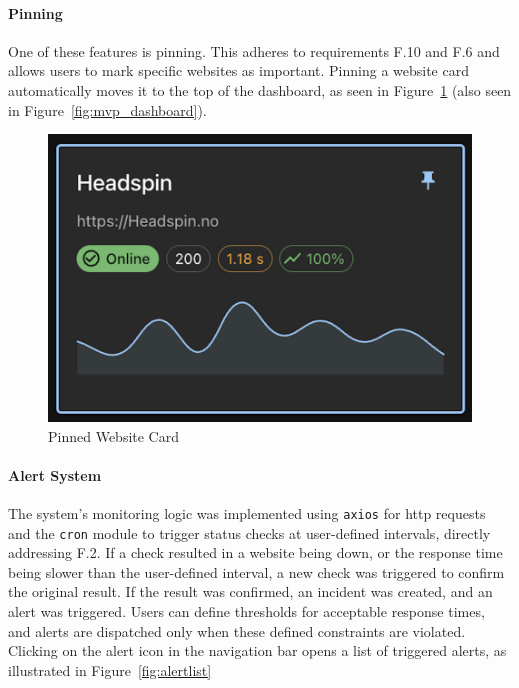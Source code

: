 \paragraph{Pinning}
One of these features is pinning. This adheres to requirements F.10 and F.6 and allows users to mark specific websites as important. Pinning a website card automatically moves it to the top of the dashboard, as seen in Figure~\ref{fig:mvp_pinned_card} (also seen in Figure~\ref{fig:mvp_dashboard}).

\begin{figure}[H]
    \centering
    \includegraphics[width=0.5\linewidth]{figures/MVP-dashboard/MVP-pinned-card.png}
    \caption{Pinned Website Card}
    \label{fig:mvp_pinned_card}
\end{figure}

\paragraph{Alert System}
The system's monitoring logic was implemented using \texttt{\gls{axios}} for \gls{http} requests and the \texttt{\gls{cron}} module to trigger status checks at user-defined intervals, directly addressing F.2. If a check resulted in a website being down, or the response time being slower than the user-defined interval, a new check was triggered to confirm the original result. If the result was confirmed, an incident was created, and an alert was triggered. Users can define thresholds for acceptable response times, and alerts are dispatched only when these defined constraints are violated. Clicking on the alert icon in the navigation bar opens a list of triggered alerts, as illustrated in Figure~\ref{fig:alertlist}

